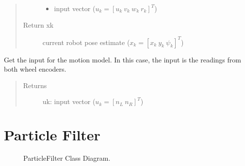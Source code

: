 \documentclass[letterpaper,10pt,english]{sphinxmanual}
\begin{document}
\begin{fulllineitems}
\begin{fulllineitems}
\begin{quote}
\begin{description}
\begin{itemize}
\item {} 
\sphinxAtStartPar
{} \textendash{} input vector (\(u_k=[u_{k}~v_{k}~w_{k}~r_{k}]^T\))

\end{itemize}

\item[{Return xk}] \leavevmode
\sphinxAtStartPar
current robot pose estimate (\(x_k=[x_{k}~y_{k}~\psi_{k}]^T\))

\end{description}\end{quote}

\end{fulllineitems}


\begin{fulllineitems}
\label{\detokenize{DRLocalization:DR_3DOFDifferentialDrive.DR_3DOFDifferentialDrive.GetInput}}
\sphinxAtStartPar
Get the input for the motion model. In this case, the input is the readings from both wheel encoders.
\begin{quote}\begin{description}
\item[{Returns}] \leavevmode
\sphinxAtStartPar
uk:  input vector (\(u_k=[n_L~n_R]^T\))

\end{description}\end{quote}

\end{fulllineitems}


\end{fulllineitems}



\section{Particle Filter}
\label{\detokenize{particle_filter:particle-filter}}\label{\detokenize{particle_filter::doc}}
\begin{figure}[htbp]
\centering
\capstart

\noindent{}
\caption{ParticleFilter Class Diagram.}\label{\detokenize{particle_filter:id1}}\end{figure}
\end{document}
